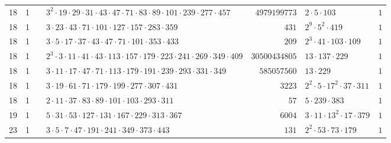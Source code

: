 \documentclass[a4paper,twoside,10pt]{report}
\renewcommand{\checkmark}{\text{\ding{51}}}
\newcommand{\cross}{\text{\ding{55}}}
\begin{document}
\begin{longtable}{rrcp{5cm}rp{5cm}r}
18 & 1 & \checkmark& $3^{2} \cdot 19 \cdot 29 \cdot 31 \cdot 43 \cdot 47 \cdot 71 \cdot 83 \cdot 89 \cdot 101 \cdot 239 \cdot 277 \cdot 457$ & $4979199773$ & $2 \cdot 5 \cdot 103$ & $1$\\
18 & 1 & \cross& $3 \cdot 23 \cdot 43 \cdot 71 \cdot 101 \cdot 127 \cdot 157 \cdot 283 \cdot 359$ & $431$ & $2^{9} \cdot 5^{2} \cdot 419$ & $1$\\
18 & 1 & \cross& $3 \cdot 5 \cdot 17 \cdot 37 \cdot 43 \cdot 47 \cdot 71 \cdot 101 \cdot 353 \cdot 433$ & $209$ & $2^{3} \cdot 41 \cdot 103 \cdot 109$ & $1$\\
18 & 1 & \checkmark& $2^{3} \cdot 3 \cdot 11 \cdot 41 \cdot 43 \cdot 113 \cdot 157 \cdot 179 \cdot 223 \cdot 241 \cdot 269 \cdot 349 \cdot 409$ & $30500434805$ & $13 \cdot 137 \cdot 229$ & $1$\\
18 & 1 & \checkmark& $3 \cdot 11 \cdot 17 \cdot 47 \cdot 71 \cdot 113 \cdot 179 \cdot 191 \cdot 239 \cdot 293 \cdot 331 \cdot 349$ & $585057560$ & $13 \cdot 229$ & $1$\\
18 & 1 & \cross& $3 \cdot 19 \cdot 61 \cdot 71 \cdot 179 \cdot 199 \cdot 277 \cdot 307 \cdot 431$ & $3223$ & $2^{2} \cdot 5 \cdot 17^{2} \cdot 37 \cdot 311$ & $1$\\
18 & 1 & \cross& $2 \cdot 11 \cdot 37 \cdot 83 \cdot 89 \cdot 101 \cdot 103 \cdot 293 \cdot 311$ & $57$ & $5 \cdot 239 \cdot 383$ & $1$\\
19 & 1 & \cross& $5 \cdot 31 \cdot 53 \cdot 127 \cdot 131 \cdot 167 \cdot 229 \cdot 313 \cdot 367$ & $6004$ & $3 \cdot 11 \cdot 13^{2} \cdot 17 \cdot 379$ & $1$\\
23 & 1 & \cross& $3 \cdot 5 \cdot 7 \cdot 47 \cdot 191 \cdot 241 \cdot 349 \cdot 373 \cdot 443$ & $131$ & $2^{2} \cdot 53 \cdot 73 \cdot 179$ & $1$\\
\end{longtable}
\end{document}
